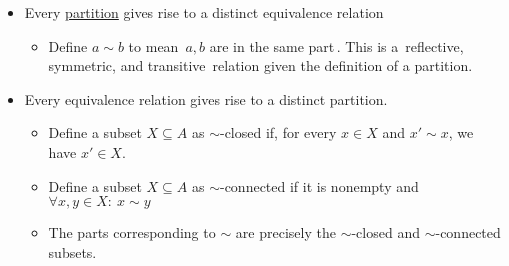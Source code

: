 \begin{itemize}
    \item Every \href{doc/1 math/Seven Sketches in Compositionality/1 Chapter 1: Generative Effects/2 What is order/Partition}{partition} gives rise to a distinct equivalence relation
          \begin{itemize} \item Define $a \sim b$ to mean \,$a,b$ are in the same part\,. This is a \,reflective, symmetric, and transitive\, relation given the definition of a partition.\end{itemize}
    \item Every equivalence relation gives rise to a distinct partition.
    \begin{itemize}
      \item Define a subset $X \subseteq A$ as $\sim$-closed if, for every $x \in X$ and $x' \sim x$, we have $x' \in X$.
    \item Define a subset $X \subseteq A$ as $\sim$-connected if it is nonempty and $\forall x,y \in X:\ x \sim y$
    \item The parts corresponding to $\sim$ are precisely the $\sim$-closed and $\sim$-connected subsets.
  \end{itemize}
\end{itemize}